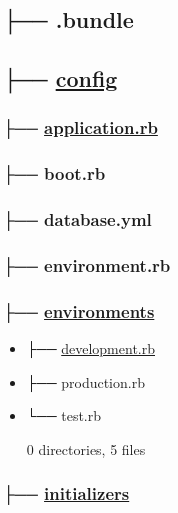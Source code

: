 \documentclass[11pt]{article}
\begin{document}
\subsection*{├── .bundle}
\label{sec-1-3}
\subsection*{├── \href{./config}{config}}
\label{sec-1-4}

\subsubsection*{├── \href{./config/application.rb}{application.rb}}
\label{sec-1-4-1}
\subsubsection*{├── boot.rb}
\label{sec-1-4-2}
\subsubsection*{├── database.yml}
\label{sec-1-4-3}
\subsubsection*{├── environment.rb}
\label{sec-1-4-4}
\subsubsection*{├── \href{./config/environments}{environments}}
\label{sec-1-4-5}

\begin{itemize}
\item ├── \href{./config/environments/development.rb}{development.rb}
\label{sec-1-4-5-1}
\item ├── production.rb
\label{sec-1-4-5-2}
\item └── test.rb
\label{sec-1-4-5-3}

0 directories, 5 files
\end{itemize}

\subsubsection*{├── \href{./config/initializers}{initializers}}
\label{sec-1-4-6}
\end{document}
